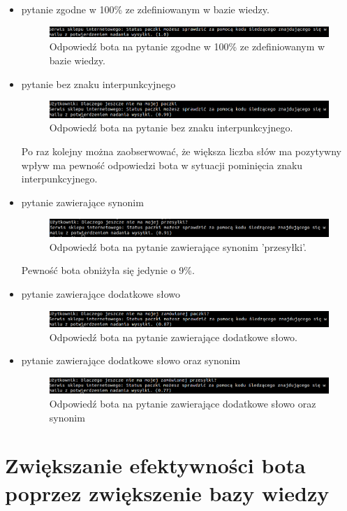 \begin{itemize}
	\item
	pytanie zgodne w 100\% ze zdefiniowanym w bazie wiedzy.
	\begin{figure}[ht]
	{\centering
		\includegraphics[width=0.9\linewidth]{rys/rys03/16}
	\caption{Odpowiedź bota na pytanie zgodne w 100\% ze zdefiniowanym w bazie wiedzy.}
	}
	\label{fig:bot4}
    \end{figure}

	\item
	pytanie bez znaku interpunkcyjnego
		\begin{figure}[ht]
	{\centering
		\includegraphics[width=0.9\linewidth]{rys/rys03/17}
	\caption{Odpowiedź bota na pytanie bez znaku interpunkcyjnego.}
	}
	\label{fig:bot4}
    \end{figure}
    
    Po raz kolejny można zaobserwować, że większa liczba słów ma pozytywny wpływ ma pewność odpowiedzi bota w sytuacji pominięcia znaku interpunkcyjnego.
    
    \newpage
    
	\item
	pytanie zawierające synonim
	\begin{figure}[ht]
	{\centering
		\includegraphics[width=0.9\linewidth]{rys/rys03/18}
	\caption{Odpowiedź bota na pytanie zawierające synonim 'przesyłki'.}
	}
	\label{fig:bot4}
    \end{figure}
    
    
    Pewność bota obniżyła się jedynie o 9\%.
	\item
	pytanie zawierające dodatkowe słowo
	
	    \begin{figure}[ht]
	{\centering
		\includegraphics[width=0.9\linewidth]{rys/rys03/19}
	\caption{Odpowiedź bota na pytanie zawierające dodatkowe słowo.}
	}
	\label{fig:bot4}
    \end{figure}
    
    \item
	pytanie zawierające dodatkowe słowo oraz synonim
	
	    \begin{figure}[ht]
	{\centering
		\includegraphics[width=0.9\linewidth]{rys/rys03/20}
	\caption{Odpowiedź bota na pytanie zawierające dodatkowe słowo oraz synonim}
	}
	\label{fig:bot4}
    \end{figure}

\end{itemize}

\newpage
\section{Zwiększanie efektywności bota poprzez zwiększenie bazy wiedzy}

